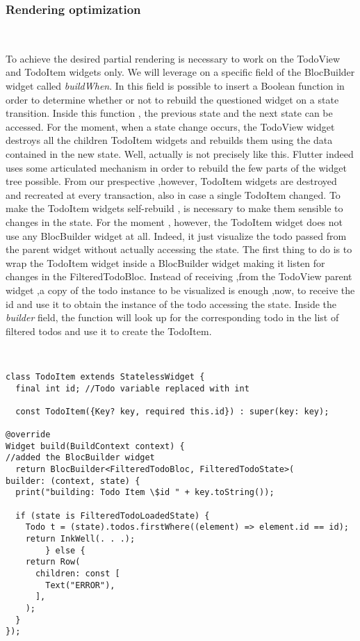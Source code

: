 \subsubsection{Rendering optimization} \mbox{}\\ \label{par:todo_app_inherited_widget_introduction}

To achieve the desired partial rendering is necessary to work on the TodoView and TodoItem widgets only. We will leverage on a specific field of the BlocBuilder widget called \textit{buildWhen}. In this field is possible to insert a Boolean function in order to determine whether or not to rebuild the questioned widget on a state transition. Inside this function , the previous state and the next state can be accessed. For the moment, when a state change occurs, the TodoView widget destroys all the children TodoItem widgets and rebuilds them using the data contained in the new state. Well, actually is not precisely like this. Flutter indeed uses some articulated mechanism in order to rebuild the few parts of the widget tree possible. From our prespective ,however, TodoItem widgets are destroyed and recreated at every transaction, also in case a single TodoItem changed. To make the TodoItem widgets self-rebuild , is necessary to make them sensible to changes in the state. For the moment , however, the TodoItem widget does not use any BlocBuilder widget at all. Indeed, it just visualize the todo passed from the parent widget without actually accessing the state. The first thing to do  is to wrap the TodoItem widget inside a BlocBuilder widget making it listen for changes in the FilteredTodoBloc. Instead of receiving ,from the TodoView parent widget ,a copy of the todo instance to be visualized is enough ,now, to receive the id and use it to obtain the instance of the todo accessing the state. Inside the \textit{builder} field, the function will look up for the corresponding todo in the list of filtered todos and use it to create the TodoItem. 
\begin{code}
\mbox{}\\
 \mbox{}
\label{code:2.14}
\begin{verbatim}
class TodoItem extends StatelessWidget {
  final int id; //Todo variable replaced with int

  const TodoItem({Key? key, required this.id}) : super(key: key);

@override
Widget build(BuildContext context) {
//added the BlocBuilder widget
  return BlocBuilder<FilteredTodoBloc, FilteredTodoState>(
builder: (context, state) {
  print("building: Todo Item \$id " + key.toString());

  if (state is FilteredTodoLoadedState) {
    Todo t = (state).todos.firstWhere((element) => element.id == id);
    return InkWell(. . .);
        } else {
    return Row(
      children: const [
        Text("ERROR"),
      ],
    );
  }
});
\end{verbatim}
\mbox{}
\end{code}

